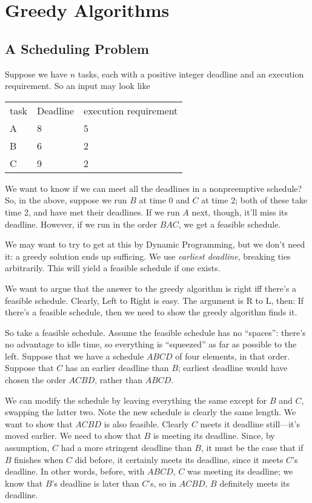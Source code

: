 \documentclass{article}
\begin{document}
\section{Greedy Algorithms}

\subsection{A Scheduling Problem}

Suppose we have $n$ tasks, each with a positive integer deadline and an
execution requirement.
So an input may look like

\begin{tabular}{| lll |}
\hline
task & Deadline & execution requirement \\
A & 8 & 5 \\
B & 6 & 2 \\
C & 9 & 2 \\\hline
\end{tabular}

We want to know if we can meet all the deadlines in a nonpreemptive schedule?
So, in the above, suppose we run $B$ at time 0 and $C$ at time 2; both
of these take time 2, and have met their deadlines. 
If we run $A$ next, though, it'll miss its deadline.
However, if we run in the order $BAC$, we get a feasible schedule.

We may want to try to get at this by Dynamic Programming, but we don't
need it: a greedy solution ends up sufficing.
We use \emph{earliest deadline}, breaking ties arbitrarily.
This will yield a feasible schedule if one exists.

We want to argue that the answer to the greedy algorithm is right iff there's
a feasible schedule.
Clearly, Left to Right is easy.
The argument is R to L, then: If there's a feasible schedule, then we need
to show the greedy algorithm finds it.

So take a feasible schedule.
Assume the feasible schedule has no ``spaces'': there's no advantage
to idle time, so everything is ``squeezed'' as far as possible to the left.
Suppose that we have a schedule $ABCD$ of four elements, in that order.
Suppose that $C$ has an earlier deadline than $B$; earliest deadline
would have chosen the order $ACBD$, rather than $ABCD$.

We can modify the schedule by leaving everything the same except for 
$B$ and $C$, swapping the latter two.
Note the new schedule is clearly the same length.
We want to show that $ACBD$ is also feasible.
Clearly $C$ meets it deadline still---it's moved earlier.
We need to show that $B$ is meeting its deadline.
Since, by assumption, $C$ had a more stringent deadline than $B$, it must
be the case that if $B$ finishes when $C$ did before, it certainly meets
its deadline, since it meets $C$'s deadline.
In other words, before, with $ABCD$, $C$ was meeting its deadline; we know that 
$B$'s deadline is later than $C$'s, so in $ACBD$, $B$ definitely meets its deadline.
\end{document}
